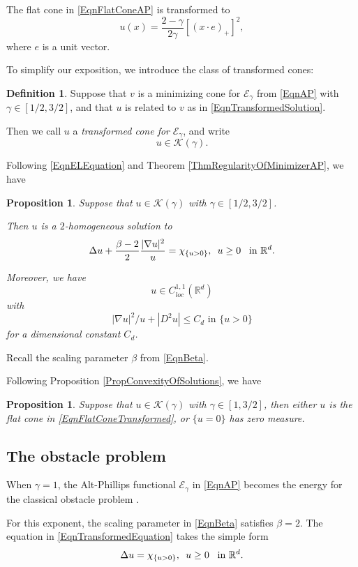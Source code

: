 \documentclass{amsart}
\def\R {\mathbb{R}}
\def\PosS{\{u>0\}}
\def\ConS{\{u=0\}}
\def\EGa{\mathcal{E}_\gamma}
\def\KGa{\mathcal{K}(\gamma)}
\def\hem{\hspace{0.5em}}
\newtheorem{prop}[thm]{Proposition}
\theoremstyle{definition}
\newtheorem{defi}[thm]{Definition}
\numberwithin{equation}{section}
\theoremstyle{remark}
\begin{document}
The flat cone in \eqref{EqnFlatConeAP} is transformed to 
\begin{equation}
\label{EqnFlatConeTransformed}
u(x)=\frac{2-\gamma}{2\gamma}[(x\cdot e)_+]^2,
\end{equation} 
where $e$ is a unit vector. 

To simplify our exposition, we introduce the class of transformed cones:
\begin{defi}
\label{DefCones}
Suppose that $v$ is a minimizing cone for $\EGa$ from  \eqref{EqnAP} with  $\gamma\in[1/2,3/2]$, and that $u$ is related to $v$ as in \eqref{EqnTransformedSolution}. 

Then we call $u$ a \textit{transformed cone for }$\EGa$, and write
$$
u\in\mathcal{K}(\gamma).
$$
\end{defi}


Following \eqref{EqnELEquation} and Theorem \ref{ThmRegularityOfMinimizerAP}, we have
\begin{prop}
\label{PropTransformed}
Suppose that $u\in\mathcal{K}(\gamma)$ with $\gamma\in[1/2,3/2]$.

Then $u$ is a $2$-homogeneous solution to 
\begin{equation}
\label{EqnTransformedEquation}
\Delta u+\frac{\beta-2}{2}\frac{|\nabla u|^2}{u}=\chi_{\{u>0\}}, \hem u\ge0\hem \text{ in }\R^d.
\end{equation}

Moreover, we have
$$
u\in C^{1,1}_{loc}(\R^d)
$$ 
with 
$$
|\nabla u|^2/u+|D^2u|\le C_d \text{ in }\PosS
$$
for a dimensional constant $C_d$.
\end{prop} 
Recall the scaling parameter $\beta$ from \eqref{EqnBeta}.

Following Proposition \ref{PropConvexityOfSolutions}, we have
\begin{prop}
\label{PropConvexityTransformed}
Suppose that $u\in\KGa$ with $\gamma\in[1,3/2]$, then
either $u$ is the flat cone in \eqref{EqnFlatConeTransformed}, or $\ConS$ has zero measure. 
\end{prop} 



\subsection{The obstacle problem}
\label{SubsectionObP}
When $\gamma=1$, the Alt-Phillips functional $\EGa$ in \eqref{EqnAP} becomes the energy for the classical obstacle problem \cite{C, PSU}.

For this exponent, the scaling parameter in \eqref{EqnBeta} satisfies 
$
\beta=2.
$
The equation in \eqref{EqnTransformedEquation} takes the simple form
\begin{equation}
\label{EqnClassicalObstacleProblem}
\Delta u=\chi_{\PosS},\hem u\ge 0\hem \text{ in }\R^d.
\end{equation}
\end{document}
